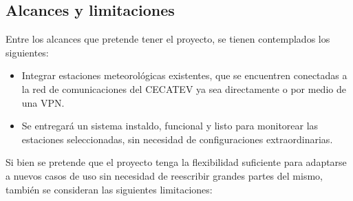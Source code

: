 

\subsection{Alcances y limitaciones}



Entre los alcances que pretende tener el proyecto, se tienen contemplados los siguientes:

\begin{itemize}

   \item Integrar estaciones meteorológicas existentes, que se encuentren conectadas a la red de comunicaciones del CECATEV ya sea directamente o por medio de una VPN.
   \item Se entregará un sistema instaldo, funcional y listo para monitorear las estaciones seleccionadas, sin necesidad de configuraciones extraordinarias.

\end{itemize}

Si bien se pretende que el proyecto tenga la flexibilidad suficiente para adaptarse a nuevos casos de uso sin necesidad de reescribir grandes partes del mismo, también se consideran las siguientes limitaciones:

